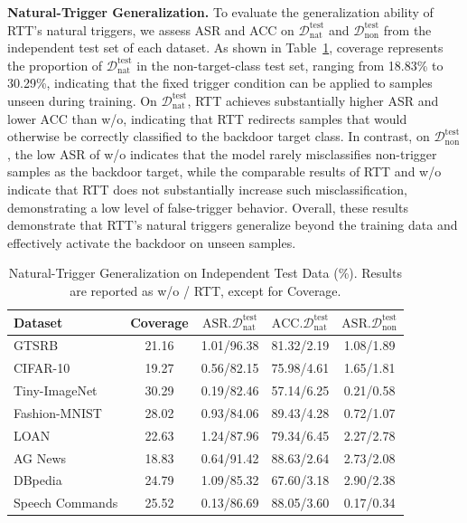 \documentclass[lettersize,journal]{IEEEtran}
\newif\ifhighlight
\newcommand{\hlthree}[1]{%
    \ifhighlight{\color{reviewer3}#1}\else#1\fi
}
\begin{document}
\hlthree{
\textbf{Natural-Trigger Generalization.}
To evaluate the generalization ability of RTT's natural triggers, we assess ASR and ACC on $\mathcal{D}_{\mathrm{nat}}^{\mathrm{test}}$ and $\mathcal{D}_{\mathrm{non}}^{\mathrm{test}}$ from the independent test set of each dataset.
As shown in Table~\ref{natural_generalization}, coverage represents the proportion of $\mathcal{D}_{\mathrm{nat}}^{\mathrm{test}}$ in the non-target-class test set, ranging from 18.83\% to 30.29\%, indicating that the fixed trigger condition can be applied to samples unseen during training.
On $\mathcal{D}_{\mathrm{nat}}^{\mathrm{test}}$, RTT achieves substantially higher ASR and lower ACC than w/o, indicating that RTT redirects samples that would otherwise be correctly classified to the backdoor target class.
In contrast, on $\mathcal{D}_{\mathrm{non}}^{\mathrm{test}}$, the low ASR of w/o indicates that the model rarely misclassifies non-trigger samples as the backdoor target, while the comparable results of RTT and w/o indicate that RTT does not substantially increase such misclassification, demonstrating a low level of false-trigger behavior.
Overall, these results demonstrate that RTT's natural triggers generalize beyond the training data and effectively activate the backdoor on unseen samples.
}

\begin{table}[t]
\hlthree{
\centering
\caption{Natural-Trigger Generalization on Independent Test Data (\%). Results are reported as w/o / RTT, except for Coverage.}
\label{natural_generalization}
\setlength{\tabcolsep}{3pt}
\renewcommand\arraystretch{1.5}
\begin{tabular}{lcccc}
\toprule
Dataset & Coverage
& $\mathrm{ASR}.\mathcal{D}_{\mathrm{nat}}^{\mathrm{test}}$
& $\mathrm{ACC}.\mathcal{D}_{\mathrm{nat}}^{\mathrm{test}}$
& $\mathrm{ASR}.\mathcal{D}_{\mathrm{non}}^{\mathrm{test}}$ \\
\midrule
GTSRB           & 21.16     & 1.01/96.38    & 81.32/2.19  & 1.08/1.89 \\
CIFAR-10        & 19.27     & 0.56/82.15    & 75.98/4.61  & 1.65/1.81 \\
Tiny-ImageNet   & 30.29     & 0.19/82.46    & 57.14/6.25  & 0.21/0.58 \\
Fashion-MNIST   & 28.02     & 0.93/84.06    & 89.43/4.28  & 0.72/1.07 \\
LOAN            & 22.63     & 1.24/87.96    & 79.34/6.45  & 2.27/2.78 \\
AG News         & 18.83     & 0.64/91.42    & 88.63/2.64  & 2.73/2.08 \\
DBpedia         & 24.79     & 1.09/85.32    & 67.60/3.18  & 2.90/2.38 \\
Speech Commands & 25.52     & 0.13/86.69    & 88.05/3.60  & 0.17/0.34 \\
\bottomrule
\end{tabular}
}
\end{table}
\end{document}
